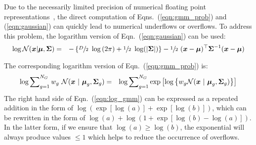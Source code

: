 Due to the necessarily limited precision of numerical floating point representations~\cite{Goldberg_1991,Monniaux_2008},
the direct computation of Eqns.~(\ref{eqn:gmm_prob}) and (\ref{eqn:gaussian}) can quickly lead to numerical underflows or overflows.
To address this problem, the logarithm version of Eqn.~(\ref{eqn:gaussian}) can be used:
%
\begin{eqnarray}
  \log {{\mathcal{N}}}( {\boldsymbol{x}} | {\boldsymbol{\mu}}, {\boldsymbol{\Sigma}} )
  & = &
  - \left\{
  \sfrac{D}{2} ~ \log \left( 2\pi \right)
  +
  \sfrac{1}{2} ~ \log ( |{\boldsymbol{\Sigma}}| )
  \right\}
  -
  \sfrac{1}{2} ~ ({\boldsymbol{x}}-{\boldsymbol{\mu}})^\top {\boldsymbol{\Sigma}}^{-1} ({\boldsymbol{x}}-{\boldsymbol{\mu}})
\end{eqnarray}

The corresponding logarithm version of Eqn.~(\ref{eqn:gmm_prob}) is:
%
\begin{eqnarray}
\log \sum\nolimits_{g=1}^{N_G} w_g ~ {{\mathcal{N}}}( {\boldsymbol{x}} ~|~ {\boldsymbol{\mu}}_g, {\boldsymbol{\Sigma}}_g )
& = &
\log \sum\nolimits_{g=1}^{N_G} \exp\left[ \log \left\{ w_g {{\mathcal{N}}}( {\boldsymbol{x}} ~|~ {\boldsymbol{\mu}}_g, {\boldsymbol{\Sigma}}_g ) \right\} \right]
\label{eqn:log_gmm}
\end{eqnarray}
The right hand side of Eqn.~(\ref{eqn:log_gmm}) can be expressed as a repeated addition in the form of \mbox{\small $\log(\exp\left[\log(a)\right] + \exp\left[\log(b)\right])$},
which can be rewritten in the form of \mbox{\small $\log(a) + \log\left( 1 + \exp\left[ \log(b) - \log(a) \right] \right)$}.
In the latter form, if we ensure that {\small $\log(a) \geq \log(b)$},
the exponential will always produce values $\leq 1$ which helps to reduce the occurrence of overflows.

